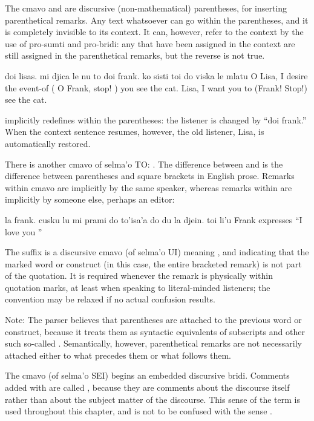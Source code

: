 The cmavo  and  are discursive (non-mathematical)
    parentheses, for inserting parenthetical remarks. Any text
    whatsoever can go within the parentheses, and it is completely
    invisible to its context. It can, however, refer to the context
    by the use of pro-sumti and pro-bridi: any that have been
    assigned in the context are still assigned in the parenthetical
    remarks, but the reverse is not true.
\begin{example}
\T	doi lisas. mi djica le nu\n
\T	to doi frank. ko sisti toi\n
\T	do viska le mlatu\n
O Lisa, I desire the event-of\n
\T	( O Frank,  stop! )\n
\T	you see the cat.\n
Lisa, I want you to (Frank! Stop!) see the cat.
\end{example}

 implicitly redefines 
    within the parentheses: the listener is changed by ``doi
    frank.'' When the context sentence resumes, however, the old
    listener, Lisa, is automatically restored. 

There is another cmavo of selma'o TO: . The
    difference between  and  is the difference
    between parentheses and square brackets in English prose.
    Remarks within  cmavo are implicitly by the same
    speaker, whereas remarks within  are implicitly
    by someone else, perhaps an editor:
\begin{example}
la frank. cusku lu mi prami do\n
\T	to'isa'a do du la djein. toi li'u\n
Frank expresses ``I love you\n
\T	{}''
\end{example}

The  suffix is a discursive cmavo (of selma'o UI)
    meaning , and indicating that the marked
    word or construct (in this case, the entire bracketed remark)
    is not part of the quotation. It is required whenever the
     remark is physically within quotation marks,
    at least when speaking to literal-minded listeners; the
    convention may be relaxed if no actual confusion results. 

Note: The parser believes that parentheses are attached to
    the previous word or construct, because it treats them as
    syntactic equivalents of subscripts and other such so-called
    . Semantically, however, parenthetical
    remarks are not necessarily attached either to what precedes
    them or what follows them.

The cmavo  (of selma'o SEI) begins an embedded
    discursive bridi. Comments added with  are called
    , because they are comments about the
    discourse itself rather than about the subject matter of the
    discourse. This sense of the term  is used
    throughout this chapter, and is not to be confused with the
    sense .

